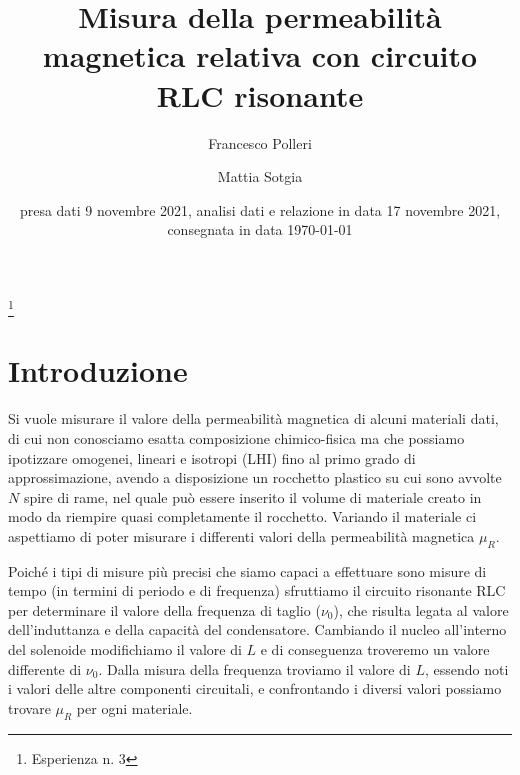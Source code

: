 \documentclass[
    rmp,
    reprint, 
    superscriptaddress, 
    altaffilletter, 
    amsmath, 
    amssymb, 
    a4paper]{revtex4-2}
\begin{document}
\title{Misura della permeabilità magnetica relativa con circuito RLC risonante
}
\thanks{Esperienza n. 3
}

\author{Francesco Polleri}
\author{Mattia Sotgia}


\date{presa dati
    9 novembre 2021, analisi dati e relazione in data 17 novembre 2021, consegnata in data
    \today
}

\begin{abstract}
    
\end{abstract}
\maketitle
\thispagestyle{fancy}


\section*{Introduzione}\label{sec:introduction}
Si vuole misurare il valore della permeabilità magnetica di alcuni materiali dati, di cui non conosciamo esatta composizione chimico-fisica ma che possiamo ipotizzare omogenei, lineari e isotropi (LHI) fino al primo grado di approssimazione, avendo a disposizione un rocchetto plastico su cui sono avvolte $N$ spire di rame, nel quale può essere inserito il volume di materiale creato in modo da riempire quasi completamente il rocchetto. Variando il materiale ci aspettiamo di poter misurare i differenti valori della permeabilità magnetica $\mu_R$. 

Poiché i tipi di misure più precisi che siamo capaci a effettuare sono misure di tempo (in termini di periodo e di frequenza) sfruttiamo il circuito risonante RLC per determinare il valore della frequenza di taglio ($\nu_0$), che risulta legata al valore dell'induttanza e della capacità del condensatore. Cambiando il nucleo all'interno del solenoide modifichiamo il valore di $L$ e di conseguenza troveremo un valore differente di $\nu_0$. Dalla misura della frequenza troviamo il valore di $L$, essendo noti i valori delle altre componenti circuitali, e confrontando i diversi valori possiamo trovare $\mu_R$ per ogni materiale.
\end{document}

